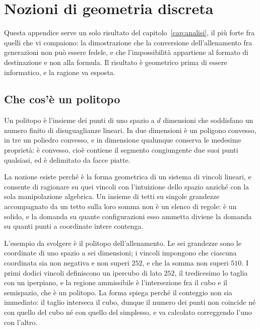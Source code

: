 
\chapter{Nozioni di geometria discreta}
\label{app:geometria}

Questa appendice serve un solo risultato del capitolo~\ref{cap:analisi}, il più forte fra quelli che vi compaiono: la dimostrazione che la conversione dell'allenamento fra generazioni non può essere fedele, e che l'impossibilità appartiene al formato di destinazione e non alla formula. Il risultato è geometrico prima di essere informatico, e la ragione va esposta.

\section{Che cos'è un politopo}

Un politopo è l'insieme dei punti di uno spazio a $d$ dimensioni che soddisfano un numero finito di disuguaglianze lineari. In due dimensioni è un poligono convesso, in tre un poliedro convesso, e in dimensione qualunque conserva le medesime proprietà: è convesso, cioè contiene il segmento congiungente due suoi punti qualsiasi, ed è delimitato da facce piatte.

La nozione esiste perché è la forma geometrica di un sistema di vincoli lineari, e consente di ragionare su quei vincoli con l'intuizione dello spazio anziché con la sola manipolazione algebrica. Un insieme di tetti su singole grandezze accompagnato da un tetto sulla loro somma non è un elenco di regole: è un solido, e la domanda su quante configurazioni esso ammetta diviene la domanda su quanti punti a coordinate intere contenga.

L'esempio da svolgere è il politopo dell'allenamento. Le sei grandezze sono le coordinate di uno spazio a sei dimensioni; i vincoli impongono che ciascuna coordinata sia non negativa e non superi $252$, e che la somma non superi $510$. I primi dodici vincoli definiscono un ipercubo di lato $252$, il tredicesimo lo taglia con un iperpiano, e la regione ammissibile è l'intersezione fra il cubo e il semispazio, che è un politopo. La forma spiega perché il conteggio non sia immediato: il taglio interseca il cubo, dunque il numero dei punti non coincide né con quello del cubo né con quello del simplesso, e va calcolato correggendo l'uno con l'altro.

